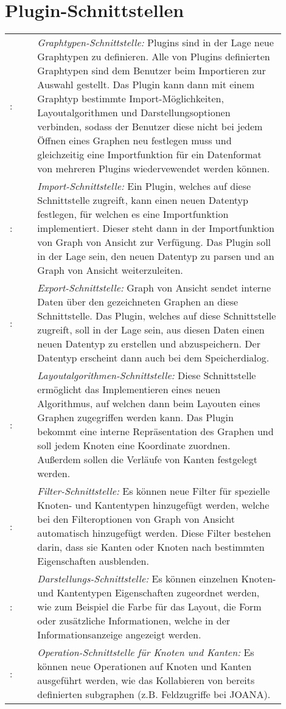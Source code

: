 \chapter{Plugin-Schnittstellen}
\label{ch:plugschnitt}


\setcounter{psnr}{10}
\newcommand{\psno}{\ifnum\value{psnr}<10 00\else\ifnum\value{psnr}<100 0\fi\fi\arabic{psnr}\addtocounter{psnr}{10}}
\renewcommand\thesubsubsection{/S\ifnum\value{psnr}<10 000\else\ifnum\value{psnr}<100 00\else\ifnum\value{psnr}<1000 0\fi\fi\fi\arabic{psnr}/}
\newcommand\ps[2]{\namedlabel{s:#1}{\textbf{/S\psno/}}: & #2 \\ [1ex] }

\begin{tabular}{lp{0.9\linewidth}}
  \ps{graphtyp}{\textit{Graphtypen-Schnittstelle:} Plugins sind in der Lage neue Graphtypen zu definieren. Alle von Plugins definierten Graphtypen sind dem Benutzer beim Importieren zur Auswahl gestellt. Das Plugin kann dann mit einem Graphtyp bestimmte Import-Möglichkeiten, Layoutalgorithmen und Darstellungsoptionen verbinden, sodass der Benutzer diese nicht bei jedem Öffnen eines Graphen neu festlegen muss und gleichzeitig eine Importfunktion für ein Datenformat von mehreren Plugins wiedervewendet werden können.}
  \ps{import}{\textit{Import-Schnittstelle:} Ein Plugin, welches auf diese Schnittstelle zugreift, kann einen neuen Datentyp festlegen, für welchen es eine Importfunktion implementiert. Dieser steht dann in der Importfunktion von Graph von Ansicht zur Verfügung. Das Plugin soll in der Lage sein, den neuen Datentyp zu parsen und an Graph von Ansicht weiterzuleiten.}
  \ps{export}{\textit{Export-Schnittstelle:} Graph von Ansicht sendet interne Daten über den gezeichneten Graphen an diese Schnittstelle. Das Plugin, welches auf diese Schnittstelle zugreift, soll in der Lage sein, aus diesen Daten einen neuen Datentyp zu erstellen und abzuspeichern. Der Datentyp erscheint dann auch bei dem Speicherdialog.}
  \ps{layoutalgo}{\textit{Layoutalgorithmen-Schnittstelle:} Diese Schnittstelle ermöglicht das Implementieren eines neuen Algorithmus, auf welchen dann beim Layouten eines Graphen zugegriffen werden kann. Das Plugin bekommt eine interne Repräsentation des Graphen und soll jedem Knoten eine Koordinate zuordnen. Außerdem sollen die Verläufe von Kanten festgelegt werden.}
  \ps{filter}{\textit{Filter-Schnittstelle:} Es können neue Filter für spezielle Knoten- und Kantentypen hinzugefügt werden, welche bei den Filteroptionen von Graph von Ansicht automatisch hinzugefügt werden. Diese Filter bestehen darin, dass sie Kanten oder Knoten nach bestimmten Eigenschaften ausblenden.}
  \ps{darstellung}{\textit{Darstellungs-Schnittstelle:} Es können einzelnen Knoten- und Kantentypen Eigenschaften zugeordnet werden, wie zum Beispiel die Farbe für das Layout, die Form oder zusätzliche Informationen, welche in der Informationsanzeige angezeigt werden.}
  \ps{operationen}{\textit{Operation-Schnittstelle für Knoten und Kanten:} Es können neue Operationen auf Knoten und Kanten ausgeführt werden, wie das Kollabieren von bereits definierten \gls{subgraph}en (z.B. Feldzugriffe bei JOANA).}
\end{tabular}
